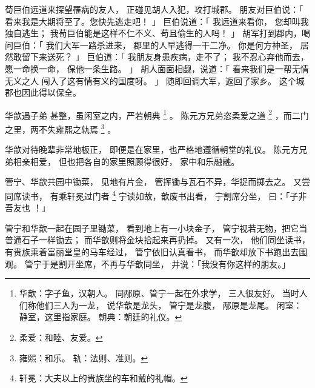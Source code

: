 \begin{paracol}{2}
\switchcolumn

荀巨伯远道来探望罹病的友人，
正碰见胡人入犯，攻打城郡。
朋友对巨伯说：「
    看来我是大期将至了。您快先逃走吧！
」
巨伯说道：「
    我远道来看你，
    您却叫我独自逃生；
    我荀巨伯能是这样不仁不义、苟且偷生的人吗！
」
胡军打到郡内，喝问巨伯：「
    我们大军一路杀进来，
    郡里的人早逃得一干二净。
    你是何方神圣，
    居然敢留下来送死？
」
巨伯道：「
    我朋友身患疾病，走不了；
    我不忍心弃他而去，
    愿一命换一命，
    保他一条生路。
」
胡人面面相觑，说道：「
    看来我们是一帮无情无义之人
    闯入了这有情有义的国度呀。
」
随即回调大军，返回了家乡。
这个城郡也因此得以保全。


\switchcolumn*[\section{}]

华歆遇子弟
甚整，虽闲室之内，严若朝典%
\footnote{%
    华歆：字子鱼，汉朝人。
          同邴原、管宁一起在外求学，
          三人很友好。
          当时人们称他们三人为一龙，
          说华歆是龙头，
          管宁是龙腹，
          邴原是龙尾。
    闲室：静室，这里指家庭。
    朝典：朝廷的礼仪。
}%
。
陈元方兄弟恣柔爱之道%
\footnote{%
    柔爱：和睦、友爱。
}%
，而二门之里，两不失雍熙之轨焉%
\footnote{%
    雍熙：和乐。
    轨：法则、准则。
}%
。

\switchcolumn

华歆对待晚辈非常地板正，
即便是在家里，也严格地遵循朝堂的礼仪。
陈元方兄弟相亲相爱，
但也把各自的家里照顾得很好，
家中和乐融融。


\switchcolumn*[\section{}]

管宁、华歆共园中锄菜，
见地有片金，
管挥锄与瓦石不异，华捉而掷去之。
又尝同席读书，
有乘轩冕过门者%
\footnote{%
    轩冕：大夫以上的贵族坐的车和戴的礼帽。
}%
宁读如故，歆废书出看，
宁割席分坐，
曰：「子非吾友也 ！」

\switchcolumn

管宁和华歆一起在园子里锄菜，
看到地上有一小块金子，
管宁视若无物，把它当普通石子一样锄去；
而华歆则将金块拾起来再扔掉。
又有一次，
他们同坐读书，
有贵族乘着富丽堂皇的马车经过，
管宁依旧认真看书，
而华歆却放下书跑出去围观。
管宁于是割开坐席，不再与华歆同坐，
并说：「我没有你这样的朋友。」


\end{paracol}
